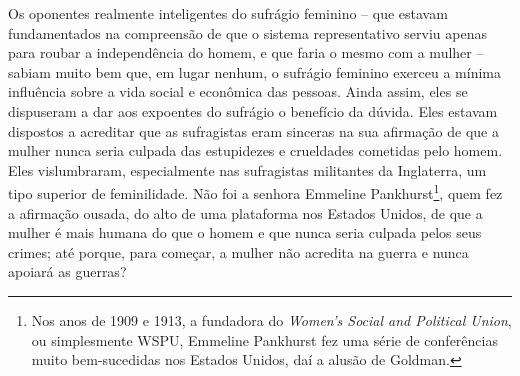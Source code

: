 Os oponentes realmente inteligentes do sufrágio feminino -- que estavam
fundamentados na compreensão de que o sistema representativo serviu
apenas para roubar a independência do homem, e que faria o mesmo com a
mulher -- sabiam muito bem que, em lugar nenhum, o sufrágio feminino
exerceu a mínima influência sobre a vida social e econômica das pessoas.
Ainda assim, eles se dispuseram a dar aos expoentes do sufrágio o
benefício da dúvida. Eles estavam dispostos a acreditar que as
sufragistas eram sinceras na sua afirmação de que a mulher nunca seria
culpada das estupidezes e crueldades cometidas pelo homem. Eles
vislumbraram, especialmente nas sufragistas militantes da Inglaterra, um
tipo superior de feminilidade. Não foi a senhora Emmeline
Pankhurst\footnote{Nos anos de 1909 e 1913, a fundadora do \emph{Women's
  Social and Political Union}, ou simplesmente WSPU, Emmeline Pankhurst
  fez uma série de conferências muito bem-sucedidas nos Estados Unidos,
  daí a alusão de Goldman.}, quem fez a afirmação ousada, do alto de uma
plataforma nos Estados Unidos, de que a mulher é mais humana do que o
homem e que nunca seria culpada pelos seus crimes; até porque, para
começar, a mulher não acredita na guerra e nunca apoiará as guerras?

